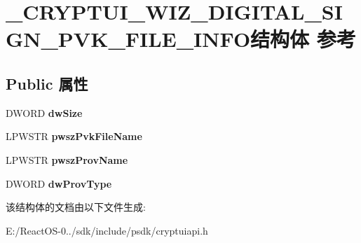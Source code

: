 \hypertarget{struct___c_r_y_p_t_u_i___w_i_z___d_i_g_i_t_a_l___s_i_g_n___p_v_k___f_i_l_e___i_n_f_o}{}\section{\+\_\+\+C\+R\+Y\+P\+T\+U\+I\+\_\+\+W\+I\+Z\+\_\+\+D\+I\+G\+I\+T\+A\+L\+\_\+\+S\+I\+G\+N\+\_\+\+P\+V\+K\+\_\+\+F\+I\+L\+E\+\_\+\+I\+N\+F\+O结构体 参考}
\label{struct___c_r_y_p_t_u_i___w_i_z___d_i_g_i_t_a_l___s_i_g_n___p_v_k___f_i_l_e___i_n_f_o}
\subsection*{Public 属性}
\begin{DoxyCompactItemize}
\item 
\mbox{\label{struct___c_r_y_p_t_u_i___w_i_z___d_i_g_i_t_a_l___s_i_g_n___p_v_k___f_i_l_e___i_n_f_o_a87e10015a68c1a05a913dab5e6f6ef58}} 
D\+W\+O\+RD {\bfseries dw\+Size}
\item 
\mbox{\label{struct___c_r_y_p_t_u_i___w_i_z___d_i_g_i_t_a_l___s_i_g_n___p_v_k___f_i_l_e___i_n_f_o_ae49f262a957ec39634052fdabff1485e}} 
L\+P\+W\+S\+TR {\bfseries pwsz\+Pvk\+File\+Name}
\item 
\mbox{\label{struct___c_r_y_p_t_u_i___w_i_z___d_i_g_i_t_a_l___s_i_g_n___p_v_k___f_i_l_e___i_n_f_o_a849c19c445b08cebfd630096a9ffb313}} 
L\+P\+W\+S\+TR {\bfseries pwsz\+Prov\+Name}
\item 
\mbox{\label{struct___c_r_y_p_t_u_i___w_i_z___d_i_g_i_t_a_l___s_i_g_n___p_v_k___f_i_l_e___i_n_f_o_a08f04bbaa57071375b1abedf5204aa2e}} 
D\+W\+O\+RD {\bfseries dw\+Prov\+Type}
\end{DoxyCompactItemize}


该结构体的文档由以下文件生成\+:\begin{DoxyCompactItemize}
\item 
E\+:/\+React\+O\+S-\/0../sdk/include/psdk/cryptuiapi.\+h\end{DoxyCompactItemize}
